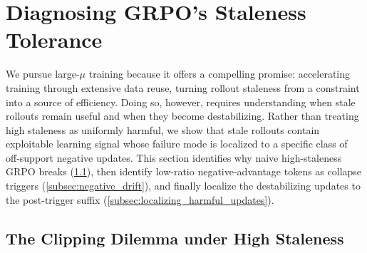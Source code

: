 \section{Diagnosing GRPO's Staleness Tolerance}
\label{sec:diagnosis}

We pursue large-$\mu$ training because it offers a compelling promise: accelerating training through extensive data reuse, turning rollout staleness from a constraint into a source of efficiency. Doing so, however, requires understanding when stale rollouts remain useful and when they become destabilizing. Rather than treating high staleness as uniformly harmful, we show that stale rollouts contain exploitable learning signal whose failure mode is localized to a specific class of off-support negative updates. This section identifies why naive high-staleness GRPO breaks (\cref{subsec:clipping_dilemma}), then identify low-ratio negative-advantage
tokens as collapse triggers (\cref{subsec:negative_drift}), and finally localize
the destabilizing updates to the post-trigger suffix
(\cref{subsec:localizing_harmful_updates}).






\subsection{The Clipping Dilemma under High Staleness}
\label{subsec:clipping_dilemma}


